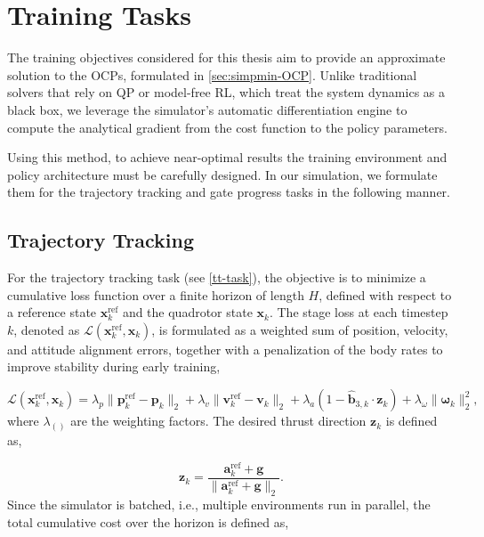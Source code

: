 \section{Training Tasks} \label{sec:tasks}

The training objectives considered for this thesis aim to provide an approximate solution to the \ac{OCP}s, formulated in \autoref{sec:simpmin-OCP}.
Unlike traditional solvers that rely on \ac{QP} or model-free \ac{RL}, which treat the system dynamics as a black box, we leverage the simulator's automatic differentiation engine to compute the analytical gradient from the cost function to the policy parameters.

Using this method, to achieve near-optimal results the training environment and policy architecture must be carefully designed.
In our simulation, we formulate them for the trajectory tracking and gate progress tasks in the following manner.

\subsection{Trajectory Tracking}\label{subsec::TT}

For the trajectory tracking task (see \autoref{tt-task}), the objective is to minimize a cumulative loss function over a finite horizon of length $H$, defined with respect to a reference state $\mathbf{x}_k^\text{ref}$ and the quadrotor state $\mathbf{x}_k$.
The stage loss at each timestep $k$, denoted as $\mathcal{L}(\mathbf{x}_k^\text{ref}, \mathbf{x}_k)$, is formulated as a weighted sum of position, velocity, and attitude alignment errors, together with a penalization of the body rates to improve stability during early training,

\begin{equation}\label{acc_loss}
\mathcal{L}(\mathbf{x}_k^\text{ref}, \mathbf{x}_k) =
\lambda_p \|\mathbf{p}_k^\text{ref} - \mathbf{p}_k\|_2 +
\lambda_v \|\mathbf{v}_k^\text{ref} - \mathbf{v}_k\|_2 +
\lambda_a \left(1 - \mathbf{\hat{b}}_{3,k} \cdot \mathbf{z}_k \right) +
\lambda_\omega \|\boldsymbol{\omega}_k\|_2^2,
\end{equation}
 where $\lambda_{()}$ are the weighting factors. The desired thrust direction $\mathbf{z}_k$ is defined as,

\begin{equation}
\mathbf{z}_k =
\frac{\mathbf{a}_k^\text{ref} + \mathbf{g}}{\|\mathbf{a}_k^\text{ref} + \mathbf{g}\|_2}.
\end{equation}
Since the simulator is batched, i.e., multiple environments run in parallel, the total cumulative cost over the horizon is defined as,


